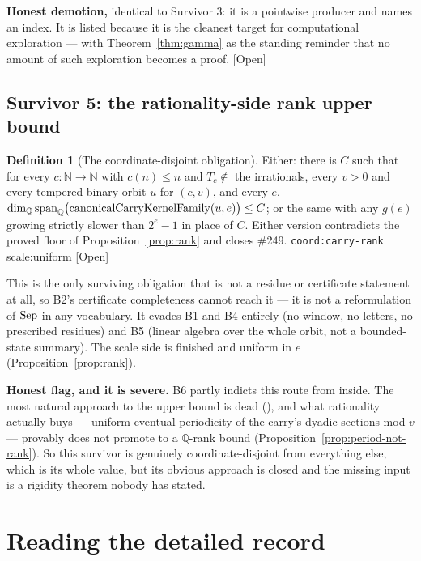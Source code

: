 \documentclass[11pt]{article}
\theoremstyle{plain}
\theoremstyle{definition}
\newtheorem{defn}[thm]{Definition}
\theoremstyle{remark}
\newcommand{\lean}[2]{\leanlink{#2}}
\let\origmathrm\mathrm
\renewcommand{\mathrm}[1]{\ifmmode\origmathrm{#1}\else\textrm{#1}\fi}%
\newcommand{\ev}[1]{{\small\textsf{[#1]}}\xspace}
\newcommand{\scale}[1]{{\small\textsf{scale:#1}}\xspace}
\newcommand{\coord}[1]{\texorpdfstring{{\small\nolinkurl{coord:#1}}}{coord:#1}\xspace}
\newcommand{\N}{\mathbb{N}}
\newcommand{\Q}{\mathbb{Q}}
\begin{document}
\textbf{Honest demotion,} identical to Survivor 3: it is a pointwise producer
and names an index. It is listed because it is the cleanest target for
computational exploration --- with Theorem~\ref{thm:gamma} as the standing
reminder that no amount of such exploration becomes a proof. \ev{Open}

\subsection{Survivor 5: the rationality-side rank upper bound}

\begin{defn}[The coordinate-disjoint obligation]
\label{defn:rankupper}
Either: there is $C$ such that for every $c : \N \to \N$ with $c(n) \le n$ and
$T_c \notin$ the irrationals, every $v > 0$ and every tempered binary orbit
$u$ for $(c,v)$, and every $e$,
$\dim_{\Q} \mathrm{span}_{\Q}\bigl(\mathrm{canonicalCarryKernelFamily}(u,e)\bigr) \le C$;
or the same with any $g(e)$ growing strictly slower than $2^{e}-1$ in place of
$C$. Either version contradicts the proved floor of
Proposition~\ref{prop:rank} and closes \#249.
\coord{carry-rank} \scale{uniform} \ev{Open}
\end{defn}

This is the only surviving obligation that is not a residue or certificate
statement at all, so B2's certificate completeness cannot reach it --- it is
not a reformulation of $\mathrm{Sep}$ in any vocabulary. It evades B1 and B4
entirely (no window, no letters, no prescribed residues) and B5 (linear algebra
over the whole orbit, not a bounded-state summary). The scale side is finished
and uniform in $e$ (Proposition~\ref{prop:rank}).

\textbf{Honest flag, and it is severe.} B6 partly indicts this route from
inside. The most natural approach to the upper bound is dead
(\lean{Erdos249257.false\_of\_compressedAdjointCertificate}{TotientMahlerDefect.lean:1183}),
and what rationality actually buys --- uniform eventual periodicity of the
carry's dyadic sections mod $v$ --- provably does not promote to a $\Q$-rank
bound (Proposition~\ref{prop:period-not-rank}). So this survivor is genuinely
coordinate-disjoint from everything else, which is its whole value, but its
obvious approach is closed and the missing input is a rigidity theorem nobody
has stated.

\section{Reading the detailed record}
\end{document}
